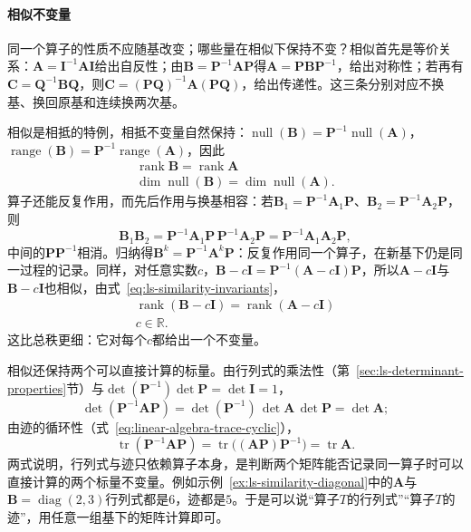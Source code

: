 \paragraph{相似不变量}
\label{sec:ls-similarity-properties}
同一个算子的性质不应随基改变；哪些量在相似下保持不变？相似首先是等价关系：$\bm A=\bm I^{-1}\bm A\bm I$给出自反性；由$\bm B=\bm P^{-1}\bm A\bm P$得$\bm A=\bm P\bm B\bm P^{-1}$，给出对称性；若再有$\bm C=\bm Q^{-1}\bm B\bm Q$，则$\bm C=(\bm P\bm Q)^{-1}\bm A(\bm P\bm Q)$，给出传递性。这三条分别对应不换基、换回原基和连续换两次基。

相似是相抵的特例，相抵不变量自然保持：$\operatorname{null}(\bm B)=\bm P^{-1}\operatorname{null}(\bm A)$，$\operatorname{range}(\bm B)=\bm P^{-1}\operatorname{range}(\bm A)$，因此
\begin{equation}
\begin{gathered}
\operatorname{rank}\bm B=\operatorname{rank}\bm A\\
\dim\operatorname{null}(\bm B)=\dim\operatorname{null}(\bm A).
\end{gathered}
\label{eq:ls-similarity-invariants}
\end{equation}
算子还能反复作用，而先后作用与换基相容：若$\bm B_1=\bm P^{-1}\bm A_1\bm P$、$\bm B_2=\bm P^{-1}\bm A_2\bm P$，则
\begin{equation}
 \bm B_1\bm B_2
 =\bm P^{-1}\bm A_1\bm P\,\bm P^{-1}\bm A_2\bm P
 =\bm P^{-1}\bm A_1\bm A_2\bm P,
 \label{eq:ls-similarity-product}
\end{equation}
中间的$\bm P\bm P^{-1}$相消。归纳得$\bm B^k=\bm P^{-1}\bm A^k\bm P$：反复作用同一个算子，在新基下仍是同一过程的记录。同样，对任意实数$c$，$\bm B-c\bm I=\bm P^{-1}(\bm A-c\bm I)\bm P$，所以$\bm A-c\bm I$与$\bm B-c\bm I$也相似，由式~\eqref{eq:ls-similarity-invariants}，
\begin{equation}
\begin{gathered}
\operatorname{rank}(\bm B-c\bm I)=\operatorname{rank}(\bm A-c\bm I)\\
c\in\mathbb R.
\end{gathered}
\label{eq:ls-similarity-shifted-rank}
\end{equation}
这比总秩更细：它对每个$c$都给出一个不变量。

相似还保持两个可以直接计算的标量。由行列式的乘法性（第~\ref{sec:ls-determinant-properties}节）与$\det(\bm P^{-1})\det\bm P=\det\bm I=1$，
\[
 \det(\bm P^{-1}\bm A\bm P)=\det(\bm P^{-1})\,\det\bm A\,\det\bm P=\det\bm A;
\]
由迹的循环性（式~\eqref{eq:linear-algebra-trace-cyclic}），
\[
 \operatorname{tr}(\bm P^{-1}\bm A\bm P)=\operatorname{tr}\bigl((\bm A\bm P)\bm P^{-1}\bigr)=\operatorname{tr}\bm A.
\]
两式说明，行列式与迹只依赖算子本身，是判断两个矩阵能否记录同一算子时可以直接计算的两个标量不变量。例如示例~\ref{ex:ls-similarity-diagonal}中的$\bm A$与$\bm B=\operatorname{diag}(2,3)$行列式都是$6$，迹都是$5$。于是可以说“算子$T$的行列式”“算子$T$的迹”，用任意一组基下的矩阵计算即可。

